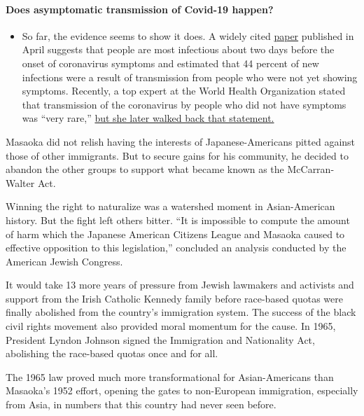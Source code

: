 \begin{itemize}
{  \paragraph{Does asymptomatic transmission of Covid-19
  happen?}\label{does-asymptomatic-transmission-of-covid-19-happen}}

  \begin{itemize}
  \tightlist
  \item
    So far, the evidence seems to show it does. A widely cited
    \href{https://www.nature.com/articles/s41591-020-0869-5}{paper}
    published in April suggests that people are most infectious about
    two days before the onset of coronavirus symptoms and estimated that
    44 percent of new infections were a result of transmission from
    people who were not yet showing symptoms. Recently, a top expert at
    the World Health Organization stated that transmission of the
    coronavirus by people who did not have symptoms was ``very rare,''
    \href{https://www.nytimes.com/2020/06/09/world/coronavirus-updates.html?action=click\&pgtype=Article\&state=default\&region=MAIN_CONTENT_3\&context=storylines_faq\#link-1f302e21}{but
    she later walked back that statement.}
  \end{itemize}
\end{itemize}

Masaoka did not relish having the interests of Japanese-Americans pitted
against those of other immigrants. But to secure gains for his
community, he decided to abandon the other groups to support what became
known as the McCarran-Walter Act.

Winning the right to naturalize was a watershed moment in Asian-American
history. But the fight left others bitter. ``It is impossible to compute
the amount of harm which the Japanese American Citizens League and
Masaoka caused to effective opposition to this legislation,'' concluded
an analysis conducted by the American Jewish Congress.

It would take 13 more years of pressure from Jewish lawmakers and
activists and support from the Irish Catholic Kennedy family before
race-based quotas were finally abolished from the country's immigration
system. The success of the black civil rights movement also provided
moral momentum for the cause. In 1965, President Lyndon Johnson signed
the Immigration and Nationality Act, abolishing the race-based quotas
once and for all.

The 1965 law proved much more transformational for Asian-Americans than
Masaoka's 1952 effort, opening the gates to non-European immigration,
especially from Asia, in numbers that this country had never seen
before.

